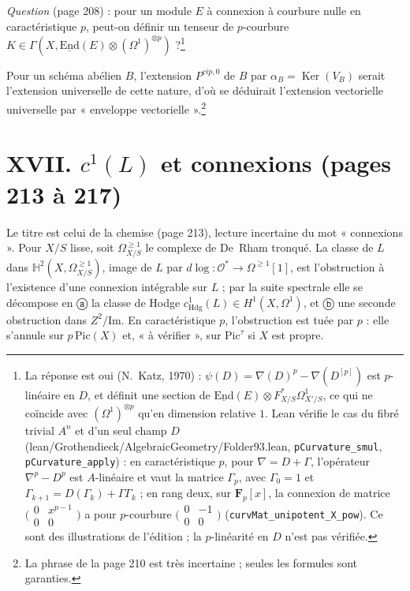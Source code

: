\documentclass[11pt,a4paper]{article}
\begin{document}
\emph{Question} (page 208) : pour un module $E$ à connexion à courbure nulle
en caractéristique $p$, peut-on définir un tenseur de $p$-courbure
$K \in \Gamma(X, \underline{\mathrm{End}}(E) \otimes (\Omega^1)^{\otimes p})$
?\footnote{La réponse est oui (N.~Katz, 1970) : $\psi(D) = \nabla(D)^p -
\nabla(D^{[p]})$ est $p$-linéaire en $D$, et définit une section de
$\underline{\mathrm{End}}(E) \otimes F^*_{X/S}\Omega^1_{X'/S}$, ce qui ne coïncide avec
$(\Omega^1)^{\otimes p}$ qu'en dimension relative $1$. Lean vérifie
le cas du fibré trivial $A^n$ et d'un seul champ $D$
(lean/Grothendieck/AlgebraicGeometry/Folder93.lean, \texttt{pCurvature\_smul},
\texttt{pCurvature\_apply}) : en caractéristique $p$, pour $\nabla = D +
\Gamma$, l'opérateur $\nabla^p - D^p$ est $A$-linéaire et vaut la matrice
$\Gamma_p$, avec $\Gamma_0 = 1$ et $\Gamma_{k+1} = D(\Gamma_k) +
\Gamma\Gamma_k$ ; en rang deux, sur $\mathbf{F}_p[x]$, la connexion de
matrice $\bigl(\begin{smallmatrix} 0 & x^{p-1} \\ 0 & 0
\end{smallmatrix}\bigr)$ a pour $p$-courbure $\bigl(\begin{smallmatrix} 0 &
-1 \\ 0 & 0 \end{smallmatrix}\bigr)$ (\texttt{curvMat\_unipotent\_X\_pow}).
Ce sont des illustrations de l'édition ; la $p$-linéarité en $D$ n'est pas
vérifiée.}

Pour un schéma abélien $B$, l'extension $P^{cip,0}$ de $B$ par
$\alpha_B = \operatorname{Ker}(V_B)$ serait l'extension universelle de cette
nature, d'où se déduirait l'extension vectorielle universelle par
« enveloppe vectorielle ».\footnote{La phrase de la page 210 est très
incertaine ; seules les formules sont garanties.}

\section*{XVII. $c^1(L)$ et connexions (pages 213 à 217)}

Le titre est celui de la chemise (page 213), lecture incertaine du mot
« connexions ». Pour $X/S$ lisse, soit $\Omega^{\geq 1}_{X/S}$ le complexe de
De~Rham tronqué. La classe de $L$ dans $\mathbb{H}^2(X, \Omega^{\geq 1}_{X/S})$,
image de $L$ par $d\log : \mathcal{O}^* \to \Omega^{\geq 1}[1]$, est
l'obstruction à l'existence d'une connexion intégrable sur $L$ ; par la
suite spectrale elle se décompose en ⓐ la classe de Hodge
$c^1_{\mathrm{Hdg}}(L) \in H^1(X, \Omega^1)$, et ⓑ une seconde obstruction dans
$Z^2/\mathrm{Im}$. En caractéristique $p$, l'obstruction est tuée par $p$ :
elle s'annule sur $p\,\mathrm{Pic}(X)$ et, « à vérifier », sur
$\mathrm{Pic}^\tau$ si $X$ est propre.
\end{document}
